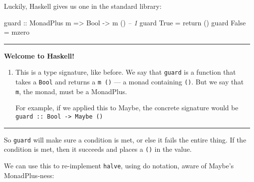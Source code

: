 \documentclass[]{article}
\newenvironment{Shaded}{}{}
\newcommand{\CommentTok}[1]{\textcolor[rgb]{0.38,0.63,0.69}{\textit{#1}}}
\newcommand{\DataTypeTok}[1]{\textcolor[rgb]{0.56,0.13,0.00}{#1}}
\newcommand{\DecValTok}[1]{\textcolor[rgb]{0.25,0.63,0.44}{#1}}
\newcommand{\FunctionTok}[1]{\textcolor[rgb]{0.02,0.16,0.49}{#1}}
\newcommand{\KeywordTok}[1]{\textcolor[rgb]{0.00,0.44,0.13}{\textbf{#1}}}
\newcommand{\NormalTok}[1]{#1}
\newcommand{\OtherTok}[1]{\textcolor[rgb]{0.00,0.44,0.13}{#1}}
\begin{document}
Luckily, Haskell gives us one in the standard library:

\begin{Shaded}
\begin{Highlighting}[]
\OtherTok{guard ::} \DataTypeTok{MonadPlus}\NormalTok{ m }\OtherTok{=>} \DataTypeTok{Bool} \OtherTok{->}\NormalTok{ m ()        }\CommentTok{-- 1}
\NormalTok{guard }\DataTypeTok{True}  \FunctionTok{=}\NormalTok{ return ()}
\NormalTok{guard }\DataTypeTok{False} \FunctionTok{=}\NormalTok{ mzero}
\end{Highlighting}
\end{Shaded}

\begin{center}\rule{0.5\linewidth}{\linethickness}\end{center}

\textbf{Welcome to Haskell!}

\begin{enumerate}
\def\labelenumi{\arabic{enumi}.}
\item
  This is a type signature, like before. We say that \texttt{guard} is a
  function that takes a \texttt{Bool} and returns a \texttt{m\ ()} --- a monad
  containing \texttt{()}. But we say that \texttt{m}, the monad, must be a
  MonadPlus.

  For example, if we applied this to Maybe, the concrete signature would be
  \texttt{guard\ ::\ Bool\ -\textgreater{}\ Maybe\ ()}
\end{enumerate}

\begin{center}\rule{0.5\linewidth}{\linethickness}\end{center}

So \texttt{guard} will make sure a condition is met, or else it fails the entire
thing. If the condition is met, then it succeeds and places a \texttt{()} in the
value.

We can use this to re-implement \texttt{halve}, using do notation, aware of
Maybe's MonadPlus-ness:

\begin{Shaded}
\end{Shaded}
\end{document}

